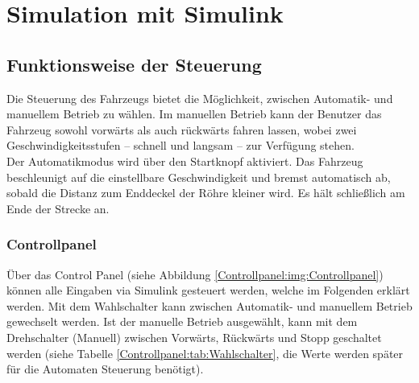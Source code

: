 
\newpage
\section{Simulation mit Simulink}
\label{section:Simulation}



\subsection{Funktionsweise der Steuerung}
\label{Steuerung}


Die Steuerung des Fahrzeugs bietet die Möglichkeit, zwischen Automatik- und manuellem Betrieb zu wählen. Im manuellen Betrieb kann der Benutzer das Fahrzeug sowohl vorwärts als auch rückwärts fahren lassen, wobei zwei Geschwindigkeitsstufen – schnell und langsam – zur Verfügung stehen.\\
Der Automatikmodus wird über den Startknopf aktiviert. Das Fahrzeug beschleunigt auf die einstellbare Geschwindigkeit und bremst automatisch ab, sobald die Distanz zum Enddeckel der Röhre kleiner wird. Es hält schließlich am Ende der Strecke an.\\

\subsubsection{Controllpanel}
\label{Steuerung:Controllpanel}
Über das Control Panel (siehe Abbildung \ref{Controllpanel:img:Controllpanel}) können alle Eingaben via Simulink gesteuert werden, welche im Folgenden erklärt werden. Mit dem Wahlschalter kann zwischen Automatik- und manuellem Betrieb gewechselt werden. Ist der manuelle Betrieb ausgewählt, kann mit dem Drehschalter (Manuell) zwischen Vorwärts, Rückwärts und Stopp geschaltet werden (siehe Tabelle \ref{Controllpanel:tab:Wahlschalter}, die Werte werden später für die Automaten Steuerung benötigt).\\


